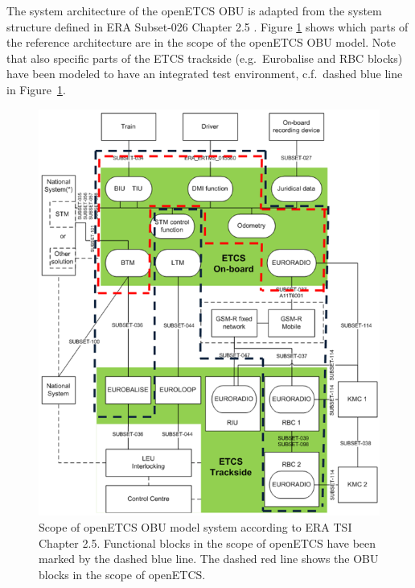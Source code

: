 
The system architecture of the openETCS OBU is adapted from the system structure defined in ERA Subset-026 Chapter 2.5 \cite{subset-026}. Figure \ref{f:architecture_srs} shows which parts of the reference architecture are in the scope of the openETCS OBU model. Note that also specific parts of the ETCS trackside (e.g.~Eurobalise and RBC blocks) have been modeled to have an integrated test environment, c.f.~dashed blue line in Figure~\ref{f:architecture_srs}.

\begin{figure}
\centering
\includegraphics[width=.7\textwidth]{images/ArchitectureSRS}
\caption[Scope of openETCS OBU model system according to ERA TSI Chapter 2.5.]{Scope of openETCS OBU model system according to ERA TSI Chapter 2.5. Functional blocks in the scope of openETCS have been marked by the dashed blue line. The dashed red line shows the OBU blocks in the scope of openETCS.}
\label{f:architecture_srs}
\end{figure}


